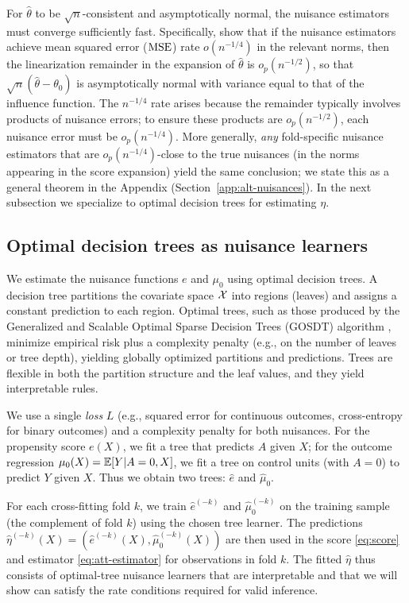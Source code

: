 \documentclass[12pt]{article}
\begin{document}
For $\hat\theta$ to be $\sqrt{n}$-consistent and asymptotically normal, the nuisance estimators must converge sufficiently fast. Specifically, \citet{chernozhukov2018} show that if the nuisance estimators achieve mean squared error ($\operatorname{MSE}$) rate $o(n^{-1/4})$ in the relevant norms, then the linearization remainder in the expansion of $\hat\theta$ is $o_p(n^{-1/2})$, so that $\sqrt{n}(\hat\theta - \theta_0)$ is asymptotically normal with variance equal to that of the influence function. The $n^{-1/4}$ rate arises because the remainder typically involves products of nuisance errors; to ensure these products are $o_p(n^{-1/2})$, each nuisance error must be $o_p(n^{-1/4})$. More generally, \emph{any} fold-specific nuisance estimators that are $o_p(n^{-1/4})$-close to the true nuisances (in the norms appearing in the score expansion) yield the same conclusion; we state this as a general theorem in the Appendix (Section~\ref{app:alt-nuisances}). In the next subsection we specialize to optimal decision trees for estimating $\eta$.

\subsection{Optimal decision trees as nuisance learners}

We estimate the nuisance functions $e$ and $\mu_0$ using optimal decision trees. A decision tree partitions the covariate space $\mathcal{X}$ into regions (leaves) and assigns a constant prediction to each region. Optimal trees, such as those produced by the Generalized and Scalable Optimal Sparse Decision Trees (GOSDT) algorithm \citep{lin2020}, minimize empirical risk plus a complexity penalty (e.g., on the number of leaves or tree depth), yielding globally optimized partitions and predictions. Trees are flexible in both the partition structure and the leaf values, and they yield interpretable rules.

We use a single \emph{loss} $L$ (e.g., squared error for continuous outcomes, cross-entropy for binary outcomes) and a complexity penalty for both nuisances. For the propensity score $e(X)$, we fit a tree that predicts $A$ given $X$; for the outcome regression $\mu_0(X) = \mathbb{E}[Y | A=0, X]$, we fit a tree on control units (with $A=0$) to predict $Y$ given $X$. Thus we obtain two trees: $\hat{e}$ and $\hat{\mu}_0$.

For each cross-fitting fold $k$, we train $\hat{e}^{(-k)}$ and $\hat{\mu}_0^{(-k)}$ on the training sample (the complement of fold $k$) using the chosen tree learner. The predictions $\hat\eta^{(-k)}(X) = (\hat{e}^{(-k)}(X), \hat{\mu}_0^{(-k)}(X))$ are then used in the score \eqref{eq:score} and estimator \eqref{eq:att-estimator} for observations in fold $k$. The fitted $\hat\eta$ thus consists of optimal-tree nuisance learners that are interpretable and that we will show can satisfy the rate conditions required for valid inference.
\end{document}
